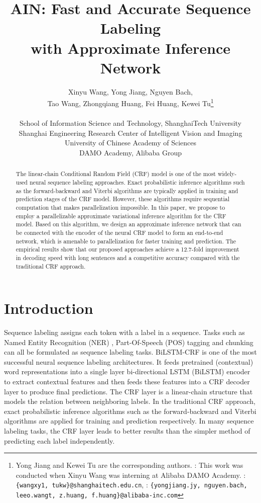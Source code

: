 \documentclass[11pt,a4paper]{article}
\title{AIN: Fast and Accurate Sequence Labeling \\with Approximate Inference Network}
\author{\parbox{\linewidth}{\centering Xinyu Wang, Yong Jiang\textsuperscript{}, Nguyen Bach, \\ Tao Wang, Zhongqiang Huang, Fei Huang,  Kewei Tu\thanks{\hspace{1mm} Yong Jiang and Kewei Tu are the corresponding authors. : This work was conducted when Xinyu Wang was interning at Alibaba DAMO Academy. : {\tt \{wangxy1, tukw\}@shanghaitech.edu.cn}, : {\tt \{yongjiang.jy, nguyen.bach, leeo.wangt, z.huang, f.huang\}@alibaba-inc.com}}} \\
 School of Information Science and Technology, ShanghaiTech University \\
 Shanghai Engineering Research Center of Intelligent Vision and Imaging \\
University of Chinese Academy of Sciences \\
 DAMO Academy, Alibaba Group \\
}
\date{}
\begin{document}
\maketitle

\begin{abstract}
The linear-chain Conditional Random Field (CRF) model is one of the most widely-used neural sequence labeling approaches. Exact probabilistic inference algorithms such as the forward-backward and Viterbi algorithms are typically applied in training and prediction stages of the CRF model. However, these algorithms require sequential computation that makes parallelization impossible. In this paper, we propose to employ a parallelizable approximate variational inference algorithm for the CRF model. Based on this algorithm, we design an approximate inference network that can be connected with the encoder of the neural CRF model to form an end-to-end network, which is amenable to parallelization for faster training and prediction. The empirical results show that our proposed approaches achieve a 12.7-fold improvement in decoding speed with long sentences and a competitive accuracy compared with the traditional CRF approach.

\end{abstract}

\section{Introduction}
Sequence labeling assigns each token with a label in a sequence. Tasks such as Named Entity Recognition (NER) \cite{Sundheim1995NamedET}, Part-Of-Speech (POS) tagging \cite{derose-1988-grammatical} and chunking \cite{tjong-kim-sang-buchholz-2000-introduction} can all be formulated as sequence labeling tasks. BiLSTM-CRF \cite{huang2015bidirectional,lample-etal-2016-neural,ma-hovy-2016-end} is one of the most successful neural sequence labeling architectures. It feeds pretrained (contextual) word representations into a single layer bi-directional LSTM (BiLSTM) encoder to extract contextual features and then feeds these features into a CRF \cite{10.5555/645530.655813} decoder layer to produce final predictions. The CRF layer is a linear-chain structure that models the relation between neighboring labels. In the traditional CRF approach, exact probabilistic inference algorithms such as the forward-backward and Viterbi algorithms are applied for training and prediction respectively. 
In many sequence labeling tasks, the CRF layer leads to better results than the simpler method of predicting each label independently.
\end{document}

